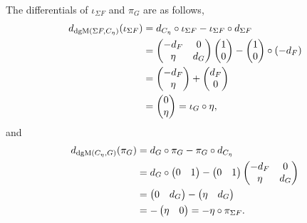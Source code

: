 \begin{remark}
    The differentials of \( \iota_{\Sigma F} \) and \( \pi_G \) are as follows,
    \begin{align*}
        d_{\operatorname{dgM}(\Sigma F, C_{\eta})}(\iota_{\Sigma F}) &= d_{C_{\eta}} \circ \iota_{\Sigma F} - \iota_{\Sigma F} \circ d_{\Sigma F} \\
        &=
        \begin{pmatrix}
            -d_F & 0 \\
            \eta & d_G
        \end{pmatrix}
        \begin{pmatrix}
            1 \\
            0
        \end{pmatrix}
        -
        \begin{pmatrix}
            1 \\
            0
        \end{pmatrix}
        \circ (- d_F) \\
        &=
        \begin{pmatrix}
            -d_F \\
            \eta
        \end{pmatrix}
        +
        \begin{pmatrix}
            d_F \\
            0
        \end{pmatrix} \\
        &=
        \begin{pmatrix}
            0 \\
            \eta
        \end{pmatrix}
        = \iota_G \circ \eta,
    \end{align*}
    and
    \begin{align*}
        d_{\operatorname{dgM}(C_{\eta}, G)}(\pi_G) &= d_G \circ \pi_G - \pi_G \circ d_{C_{\eta}} \\
        &= d_G \circ
        \begin{pmatrix}
            0 & 1
        \end{pmatrix}
        -
        \begin{pmatrix}
            0 & 1
        \end{pmatrix}
        \begin{pmatrix}
            -d_F & 0 \\
            \eta & d_G
        \end{pmatrix} \\
        &=
        \begin{pmatrix}
            0 & d_G
        \end{pmatrix}
        -
        \begin{pmatrix}
            \eta & d_G
        \end{pmatrix} \\
        &= -
        \begin{pmatrix}
            \eta & 0
        \end{pmatrix}
        = - \eta \circ \pi_{\Sigma F}.
    \end{align*}
\end{remark}

